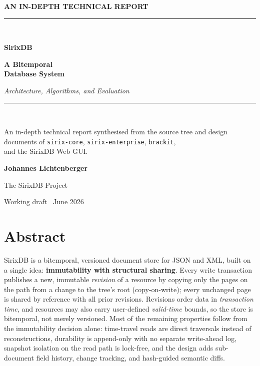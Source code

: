 \documentclass[11pt,a4paper,oneside]{report}
\theoremstyle{sirixthm}
\newcommand{\code}[1]{\texttt{#1}}
\begin{document}
\begin{titlepage}
\centering
\vspace*{1.2cm}
{\color{ember}\sffamily\large\bfseries AN IN-DEPTH TECHNICAL REPORT}\\[2pt]
{\color{boxrule}\rule{0.5\linewidth}{0.4pt}}\\[1.6cm]
{\sffamily\bfseries\color{slate}\fontsize{30}{34}\selectfont SirixDB\par}
\vspace{0.45cm}
{\sffamily\bfseries\color{slate}\LARGE A Bitemporal\\[4pt] Database System\par}
\vspace{0.9cm}
{\large\itshape Architecture, Algorithms, and Evaluation\par}
\vspace{1.7cm}
{\color{boxrule}\rule{0.7\linewidth}{0.4pt}}\\[1.0cm]
{\large An in-depth technical report synthesised from the source tree and design\\
documents of \code{sirix-core}, \code{sirix-enterprise}, \code{brackit},\\
and the SirixDB Web GUI.\par}
\vfill
{\sffamily\large\bfseries\color{slate} Johannes Lichtenberger\par}
\vspace{0.3cm}
{\large The SirixDB Project\par}
\vspace{0.7cm}
{\color{boxrule} Working draft \textperiodcentered\ June 2026}\\[2pt]
\vspace*{0.6cm}
\end{titlepage}

\chapter*{Abstract}

SirixDB is a bitemporal, versioned document store for JSON and XML, built on a single idea:
\textbf{immutability with structural sharing}. Every write transaction publishes a new,
immutable \emph{revision} of a resource by copying only the pages on the path from a change
to the tree's root (copy-on-write); every unchanged page is shared by reference with all
prior revisions. Revisions order data in \emph{transaction time}, and resources may also
carry user-defined \emph{valid-time} bounds, so the store is bitemporal, not merely
versioned. Most of the remaining properties follow from the immutability decision alone:
time-travel reads are direct traversals instead of reconstructions, durability is
append-only with no separate write-ahead log, snapshot isolation on the read path is
lock-free, and the design adds sub-document field history, change tracking, and hash-guided
semantic diffs.
\end{document}
